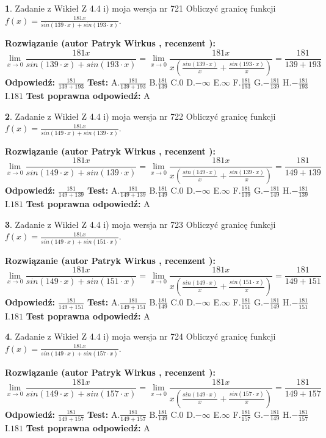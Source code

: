 \documentclass[12pt, a4paper]{article}
\theoremstyle{definition} %
\newtheorem{zad}{}
\newcommand{\zadStart}[1]{\begin{zad}#1\newline}
\newcommand{\zadStop}{\end{zad}}
\newcommand{\rozwStart}[2]{\noindent \textbf{Rozwiązanie (autor #1 , recenzent #2): }\newline}
\newcommand{\rozwStop}{\newline}
\newcommand{\odpStart}{\noindent \textbf{Odpowiedź:}\newline}
\newcommand{\odpStop}{\newline}
\newcommand{\testStart}{\noindent \textbf{Test:}\newline}
\newcommand{\testStop}{\newline}
\newcommand{\kluczStart}{\noindent \textbf{Test poprawna odpowiedź:}\newline}
\newcommand{\kluczStop}{\newline}
\begin{document}
\zadStart{Zadanie z Wikieł Z 4.4 i) moja wersja nr 721}
Obliczyć granicę funkcji $f(x)=\frac{181x}{sin(139\cdot x) +sin(193\cdot x)}$.
\zadStop
\rozwStart{Patryk Wirkus}{}
$$\lim\limits_{x\to 0}\frac{181x}{sin(139\cdot x) +sin(193\cdot x)}=\lim\limits_{x\to 0}\frac{181x}{x(\frac{sin(139\cdot x)}{x}+\frac{sin(193\cdot x)}{x})}=\frac{181}{139+193}$$
\rozwStop
\odpStart
$\frac{181}{139+193}$
\odpStop
\testStart
A.$\frac{181}{139+193}$
B.$\frac{181}{139}$
C.$0$
D.$-\infty$
E.$\infty$
F.$\frac{181}{193}$
G.$-\frac{181}{139}$
H.$-\frac{181}{193}$
I.$181$
\testStop
\kluczStart
A
\kluczStop



\zadStart{Zadanie z Wikieł Z 4.4 i) moja wersja nr 722}
Obliczyć granicę funkcji $f(x)=\frac{181x}{sin(149\cdot x) +sin(139\cdot x)}$.
\zadStop
\rozwStart{Patryk Wirkus}{}
$$\lim\limits_{x\to 0}\frac{181x}{sin(149\cdot x) +sin(139\cdot x)}=\lim\limits_{x\to 0}\frac{181x}{x(\frac{sin(149\cdot x)}{x}+\frac{sin(139\cdot x)}{x})}=\frac{181}{149+139}$$
\rozwStop
\odpStart
$\frac{181}{149+139}$
\odpStop
\testStart
A.$\frac{181}{149+139}$
B.$\frac{181}{149}$
C.$0$
D.$-\infty$
E.$\infty$
F.$\frac{181}{139}$
G.$-\frac{181}{149}$
H.$-\frac{181}{139}$
I.$181$
\testStop
\kluczStart
A
\kluczStop



\zadStart{Zadanie z Wikieł Z 4.4 i) moja wersja nr 723}
Obliczyć granicę funkcji $f(x)=\frac{181x}{sin(149\cdot x) +sin(151\cdot x)}$.
\zadStop
\rozwStart{Patryk Wirkus}{}
$$\lim\limits_{x\to 0}\frac{181x}{sin(149\cdot x) +sin(151\cdot x)}=\lim\limits_{x\to 0}\frac{181x}{x(\frac{sin(149\cdot x)}{x}+\frac{sin(151\cdot x)}{x})}=\frac{181}{149+151}$$
\rozwStop
\odpStart
$\frac{181}{149+151}$
\odpStop
\testStart
A.$\frac{181}{149+151}$
B.$\frac{181}{149}$
C.$0$
D.$-\infty$
E.$\infty$
F.$\frac{181}{151}$
G.$-\frac{181}{149}$
H.$-\frac{181}{151}$
I.$181$
\testStop
\kluczStart
A
\kluczStop



\zadStart{Zadanie z Wikieł Z 4.4 i) moja wersja nr 724}
Obliczyć granicę funkcji $f(x)=\frac{181x}{sin(149\cdot x) +sin(157\cdot x)}$.
\zadStop
\rozwStart{Patryk Wirkus}{}
$$\lim\limits_{x\to 0}\frac{181x}{sin(149\cdot x) +sin(157\cdot x)}=\lim\limits_{x\to 0}\frac{181x}{x(\frac{sin(149\cdot x)}{x}+\frac{sin(157\cdot x)}{x})}=\frac{181}{149+157}$$
\rozwStop
\odpStart
$\frac{181}{149+157}$
\odpStop
\testStart
A.$\frac{181}{149+157}$
B.$\frac{181}{149}$
C.$0$
D.$-\infty$
E.$\infty$
F.$\frac{181}{157}$
G.$-\frac{181}{149}$
H.$-\frac{181}{157}$
I.$181$
\testStop
\kluczStart
A
\kluczStop
\end{document}
